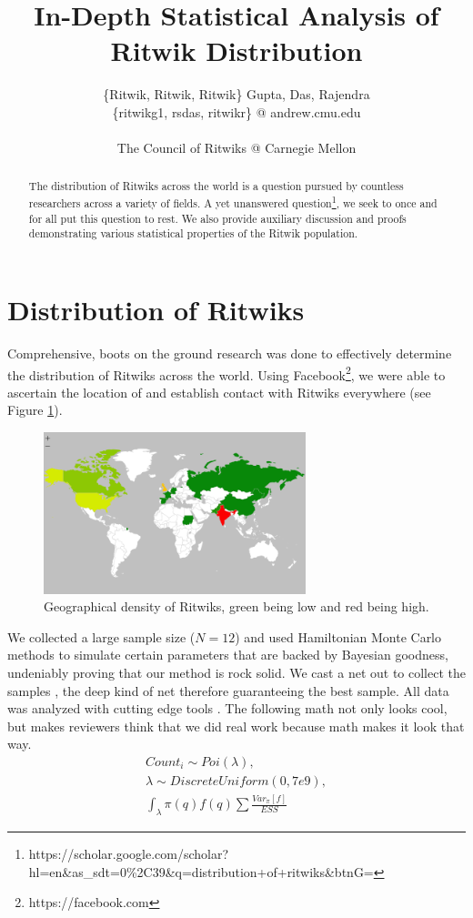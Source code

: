\documentclass[]{article}
\title{In-Depth Statistical Analysis of Ritwik Distribution}
\author{\{Ritwik, Ritwik, Ritwik\} Gupta, Das, Rajendra
	\\
	\{ritwikg1, rsdas, ritwikr\} @ andrew.cmu.edu
	\\
	\\
	The Council of Ritwiks @ Carnegie Mellon}
\date{}
\begin{document}
\maketitle

\begin{abstract}
The distribution of Ritwiks across the world is a question pursued by countless researchers across a variety of fields. A yet unanswered question\footnote{https://scholar.google.com/scholar?hl=en\&as\_sdt=0\%2C39\&q=distribution+of+ritwiks\&btnG=}, we seek to once and for all put this question to rest. We also provide auxiliary discussion and proofs demonstrating various statistical properties of the Ritwik population.
\end{abstract}

\section{Distribution of Ritwiks}
Comprehensive, boots on the ground research was done to effectively determine the distribution of Ritwiks across the world. Using Facebook\footnote{https://facebook.com}, we were able to ascertain the location of and establish contact with Ritwiks everywhere (see Figure \ref{fig:ritwikgeographicaldistro}).
\begin{figure}[h]
	\centering
	\includegraphics[width=3in]{figures/RitwikGeographicalDistro}
	\caption{Geographical density of Ritwiks, green being low and red being high.}
	\label{fig:ritwikgeographicaldistro}
\end{figure}
We collected a large sample size ($N = 12$) and used Hamiltonian Monte Carlo methods to simulate certain parameters that are backed by Bayesian goodness, undeniably proving that our method is rock solid. We cast a net out to collect the samples , the deep kind of net therefore guaranteeing the best sample. All data was analyzed with cutting edge tools \cite{Zaharia:2012:RDD:2228298.2228301, PyMC3}. The following math not only looks cool, but makes reviewers think that we did real work because math makes it look that way.
\begin{subequations}
\begin{align}
Count_i \sim Poi(\lambda),\\
\lambda \sim DiscreteUniform(0, 7e9),\\
\int_{\lambda}\pi(q)f(q)\sum{\frac{Var_\pi[f]}{ESS}}
\end{align}
\end{subequations}
\vspace{1in}
\end{document}
